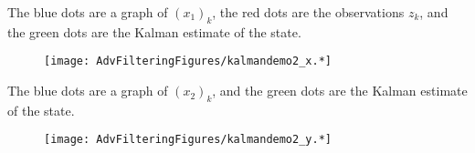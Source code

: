 \begin{Shaded}
\begin{Highlighting}[]
\OperatorTok{=}\OperatorTok{,}\OperatorTok{,}\OperatorTok{=}
\OperatorTok{=}\OperatorTok{,}\NormalTok{ x\_sim[}\OperatorTok{,:}\NormalTok{]}\OperatorTok{,}\OperatorTok{=} \OperatorTok{,}\OperatorTok{=} \OperatorTok{,}\OperatorTok{=} \NormalTok{)}
\OperatorTok{!}\OperatorTok{,}\NormalTok{z\_sim[}\OperatorTok{,:}\NormalTok{])}
\OperatorTok{!}\OperatorTok{,}\NormalTok{x\_estimate[}\OperatorTok{,:}\NormalTok{])}
\NormalTok{)}

\OperatorTok{=}\OperatorTok{,}\NormalTok{ x\_sim[}\OperatorTok{,:}\NormalTok{]}\OperatorTok{,}\OperatorTok{=} \OperatorTok{,}\OperatorTok{=} \OperatorTok{,}\OperatorTok{=} \NormalTok{)}
\OperatorTok{!}\OperatorTok{,}\NormalTok{z\_sim[}\OperatorTok{,:}\NormalTok{])}
\OperatorTok{!}\OperatorTok{,}\NormalTok{x\_estimate[}\OperatorTok{,:}\NormalTok{])}
\NormalTok{)}
\end{Highlighting}
\end{Shaded}

The blue dots are a graph of \((x_1)_k\), the red dots are the
observations \(z_k\), and the green dots are the Kalman estimate of the
state.

\begin{figure}
\centering
\texttt{[image: AdvFilteringFigures/kalmandemo2\_x.*]}
\caption{}
\end{figure}

The blue dots are a graph of \((x_2)_k\), and the green dots are the
Kalman estimate of the state.

\begin{figure}
\centering
\texttt{[image: AdvFilteringFigures/kalmandemo2\_y.*]}
\caption{}
\end{figure}

